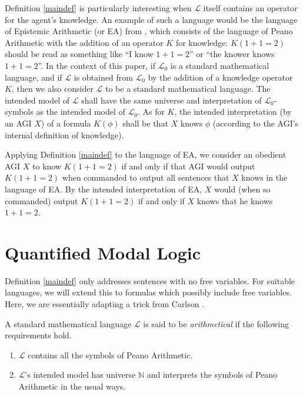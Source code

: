 \documentclass[runningheads]{llncs}
\begin{document}
Definition \ref{maindef} is particularly interesting when $\mathscr L$ itself
contains an operator for the agent's knowledge. An example of such a language would be
the language of Epistemic Arithmetic (or EA) from \cite{shapiro}, which consists of the
language of Peano Arithmetic with the addition of an operator $K$ for knowledge:
$K(1+1=2)$ should be read as something like
``I know $1+1=2$'' or ``the knower knows $1+1=2$''. In the context of this paper,
if $\mathscr L_0$ is a standard mathematical language, and if $\mathscr L$ is obtained
from $\mathscr L_0$ by the addition of a knowledge operator $K$, then we also
consider $\mathscr L$ to be a standard mathematical language. The intended model
of $\mathscr L$ shall have the same universe and interpretation of
$\mathscr L_0$-symbols as the intended model of $\mathscr L_0$. As for $K$,
the intended interpretation (by an AGI $X$) of a formula $K(\phi)$ shall be
that $X$ knows $\phi$ (according to the AGI's internal definition of knowledge).

\begin{example}
Applying Definition \ref{maindef} to the language of EA,
we consider an obedient AGI $X$ to know $K(1+1=2)$ if and only if that AGI would output
$K(1+1=2)$ when commanded to output all sentences that $X$ knows in the language of
EA. By the intended interpretation of
EA, $X$ would (when so commanded)
output $K(1+1=2)$ if and only if $X$ knows that he knows $1+1=2$.
\end{example}

\section{Quantified Modal Logic}
\label{quantifiedsection}

Definition \ref{maindef} only addresses sentences with no free variables.
For suitable languages, we will extend this to formulas which possibly include
free variables. Here, we are essentially adapting a trick from
Carlson \cite{carlson}.

\begin{definition}
  A standard mathematical language $\mathscr L$ is said to be \emph{arithmetical}
  if the following requirements hold.
  \begin{enumerate}
    \item $\mathscr L$ contains all the symbols of Peano Arithmetic.
    \item $\mathscr L$'s intended model has universe $\mathbb N$ and interprets
    the symbols of Peano Arithmetic in the usual ways.
  \end{enumerate}
\end{definition}
\end{document}
